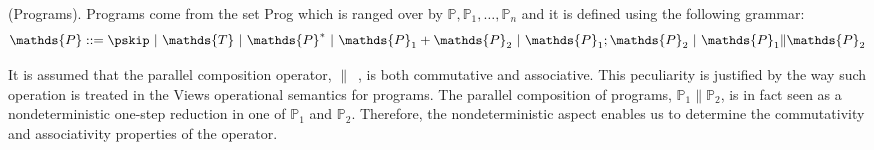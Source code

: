 \begin{defn}
	(Programs).
	Programs come from the set \textsf{Prog} which is ranged over by $\mathds{P}, \mathds{P}_1, \ldots, \mathds{P}_n$ and it is defined using the following grammar:
	\[
		\mathds{P} ::=
			\pskip\
			|\ \mathds{T}\
			|\ \mathds{P}^*\
			|\ \mathds{P}_1 + \mathds{P}_2\
			|\ \mathds{P}_1; \mathds{P}_2\
			|\ \mathds{P}_1 \| \mathds{P}_2
	\]
\end{defn}
It is assumed that the parallel composition operator, $\|$\ , is both commutative and associative. This peculiarity is justified by the way such operation is treated in the Views operational semantics for programs. The parallel composition of programs, $\mathds{P}_1 \| \mathds{P}_2$, is in fact seen as a nondeterministic one-step reduction in one of $\mathds{P}_1$ and $\mathds{P}_2$. Therefore, the nondeterministic aspect enables us to determine the commutativity and associativity properties of the operator.